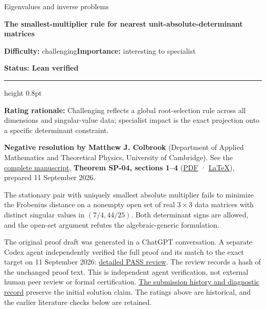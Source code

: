 \documentclass[11pt,a4paper]{article}
\makeatletter
\renewcommand{\subsection}{\Needspace{4\baselineskip}\@startsection{subsection}{2}{0pt}{9pt plus 1pt minus 1pt}{3pt}{\sffamily\bfseries\normalsize\color{ink}}}
\makeatother
\begin{document}
{\sffamily\small\color{muted}Eigenvalues and inverse problems\par}
\vspace{3pt}
{\raggedright{}\sffamily\bfseries\fontsize{21}{24}\selectfont\color{ink}The
smallest-multiplier rule for nearest unit-absolute-determinant
matrices\par}
\vspace{7pt}
{\sffamily\small\textbf{Difficulty:} challenging\quad\textbf{Importance:} interesting
to specialist\par}
{\sffamily\small\bfseries\color{accent}Status: Lean verified\par}
\vspace{4pt}
{\color{accent}\hrule height 0.8pt}
\vspace{6pt}
\textbf{Rating rationale:} Challenging reflects a global root-selection
rule across all dimensions and singular-value data; specialist impact is
the exact projection onto a specific determinant constraint.

\subsection{Resolution --- 2026-09-11}\label{resolution-2026-09-11}

\textbf{Negative resolution by Matthew J. Colbrook} (Department of
Applied Mathematics and Theoretical Physics, University of Cambridge).
See the
\href{https://github.com/ajt60gaibb/OpenProblemsInNLA/blob/main/eigenvalues-and-inverse-problems/SP-04/solution.md}{complete
manuscript}, \textbf{Theorem SP-04, sections 1--4}
(\href{https://github.com/ajt60gaibb/OpenProblemsInNLA/blob/main/eigenvalues-and-inverse-problems/SP-04/solution.pdf}{PDF}
·
\href{https://github.com/ajt60gaibb/OpenProblemsInNLA/blob/main/eigenvalues-and-inverse-problems/SP-04/solution.tex}{LaTeX}),
prepared 11 September 2026.

The stationary pair with uniquely smallest absolute multiplier fails to
minimize the Frobenius distance on a nonempty open set of real
\(3\times3\) data matrices with distinct singular values in
\((7/4,44/25)\). Both determinant signs are allowed, and the open-set
argument refutes the algebraic-generic formulation.

The original proof draft was generated in a ChatGPT conversation. A
separate Codex agent independently verified the full proof and its match
to the exact target on 11 September 2026:
\href{https://github.com/ajt60gaibb/OpenProblemsInNLA/blob/main/references/colbrook-2026-09-11/verification/reviews/SP-04-review.md}{detailed
PASS review}. The review records a hash of the unchanged proof text.
This is independent agent verification, not external human peer review
or formal certification.
\href{https://github.com/ajt60gaibb/OpenProblemsInNLA/blob/main/references/colbrook-2026-09-11/README.md}{The
submission history and diagnostic record} preserve the initial solution
claim. The ratings above are historical, and the earlier literature
checks below are retained.
\end{document}
